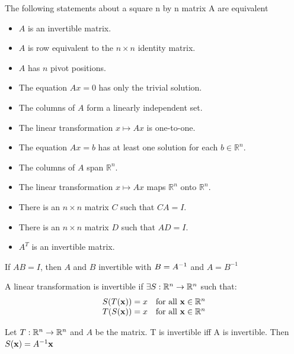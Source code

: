 \documentclass{report}
\begin{document}
\setcounter{theorem}{7}
\begin{theorem}\end{theorem}
\begin{tcolorbox}[colback=blue!5!white, colframe=blue!75!black]
The following statements about a square n by n matrix A are equivalent
\begin{itemize}
    \item \( A \) is an invertible matrix.
    \item \( A \) is row equivalent to the \( n \times n \) identity matrix.
    \item \( A \) has \( n \) pivot positions.
    \item The equation \( Ax = 0 \) has only the trivial solution.
    \item The columns of \( A \) form a linearly independent set.
    \item The linear transformation \( x \mapsto Ax \) is one-to-one.
    \item The equation \( Ax = b \) has at least one solution for each \( b \in \mathbb{R}^n \).
    \item The columns of \( A \) span \( \mathbb{R}^n \).
    \item The linear transformation \( x \mapsto Ax \) maps \( \mathbb{R}^n \) onto \( \mathbb{R}^n \).
    \item There is an \( n \times n \) matrix \( C \) such that \( CA = I \).
    \item There is an \( n \times n \) matrix \( D \) such that \( AD = I \).
    \item \( A^T \) is an invertible matrix.
\end{itemize}
\end{tcolorbox}

If $AB = I$, then $A$ and $B$ invertible with $B = A^{-1}$ and $A = B^{-1}$

A linear transformation is invertible if $\exists S: \mathbb{R}^n \to \mathbb{R}^n$ such that:
\[
\begin{array}{rlr}
    S(T(\mathbf{x})) = x & \text{for all } \mathbf{x} \in \mathbb{R}^n \\
    T(S(\mathbf{x})) = x & \text{for all } \mathbf{x} \in \mathbb{R}^n \\
\end{array}
\]

\begin{theorem}
    Let $T : \mathbb{R}^n \to \mathbb{R}^n$ and $A$ be the matrix. T is invertible iff A is invertible.
    Then $S(\mathbf{x}) = A^{-1} \mathbf{x} $
\end{theorem}
\end{document}
